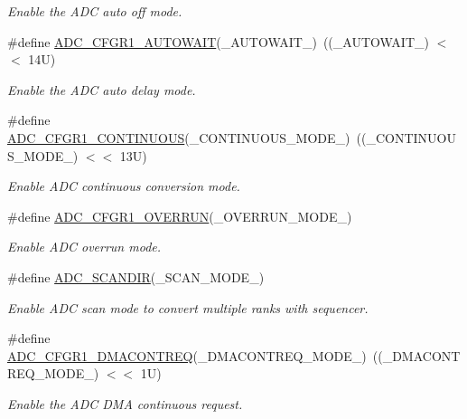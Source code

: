 \begin{DoxyCompactItemize}
\begin{DoxyCompactList}\small\item\em Enable the A\+DC auto off mode. \end{DoxyCompactList}\item 
\#define \hyperlink{group___a_d_c___private___macros_ga36fe17d7bad2f7445f201d318779051d}{A\+D\+C\+\_\+\+C\+F\+G\+R1\+\_\+\+A\+U\+T\+O\+W\+A\+IT}(\+\_\+\+A\+U\+T\+O\+W\+A\+I\+T\+\_\+)~((\+\_\+\+A\+U\+T\+O\+W\+A\+I\+T\+\_\+) $<$$<$ 14\+U)
\begin{DoxyCompactList}\small\item\em Enable the A\+DC auto delay mode. \end{DoxyCompactList}\item 
\#define \hyperlink{group___a_d_c___private___macros_gaa6d2333361167e3a510b2dd50f824a80}{A\+D\+C\+\_\+\+C\+F\+G\+R1\+\_\+\+C\+O\+N\+T\+I\+N\+U\+O\+US}(\+\_\+\+C\+O\+N\+T\+I\+N\+U\+O\+U\+S\+\_\+\+M\+O\+D\+E\+\_\+)~((\+\_\+\+C\+O\+N\+T\+I\+N\+U\+O\+U\+S\+\_\+\+M\+O\+D\+E\+\_\+) $<$$<$ 13\+U)
\begin{DoxyCompactList}\small\item\em Enable A\+DC continuous conversion mode. \end{DoxyCompactList}\item 
\#define \hyperlink{group___a_d_c___private___macros_ga0e446f9c5ff062c2f138636c1ea639a1}{A\+D\+C\+\_\+\+C\+F\+G\+R1\+\_\+\+O\+V\+E\+R\+R\+UN}(\+\_\+\+O\+V\+E\+R\+R\+U\+N\+\_\+\+M\+O\+D\+E\+\_\+)
\begin{DoxyCompactList}\small\item\em Enable A\+DC overrun mode. \end{DoxyCompactList}\item 
\#define \hyperlink{group___a_d_c___private___macros_gaf160864141810a124f506714b47446ca}{A\+D\+C\+\_\+\+S\+C\+A\+N\+D\+IR}(\+\_\+\+S\+C\+A\+N\+\_\+\+M\+O\+D\+E\+\_\+)
\begin{DoxyCompactList}\small\item\em Enable A\+DC scan mode to convert multiple ranks with sequencer. \end{DoxyCompactList}\item 
\#define \hyperlink{group___a_d_c___private___macros_ga06cee7979b56d2ad07f024f394522097}{A\+D\+C\+\_\+\+C\+F\+G\+R1\+\_\+\+D\+M\+A\+C\+O\+N\+T\+R\+EQ}(\+\_\+\+D\+M\+A\+C\+O\+N\+T\+R\+E\+Q\+\_\+\+M\+O\+D\+E\+\_\+)~((\+\_\+\+D\+M\+A\+C\+O\+N\+T\+R\+E\+Q\+\_\+\+M\+O\+D\+E\+\_\+) $<$$<$ 1\+U)
\begin{DoxyCompactList}\small\item\em Enable the A\+DC D\+MA continuous request. \end{DoxyCompactList}\item 
$$
\end{DoxyCompactItemize}
